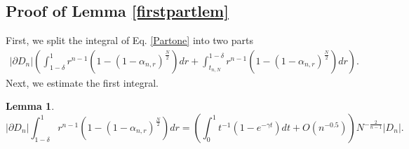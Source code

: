 \documentclass[10pt, twoside, leqno]{article}
\newtheorem{lemma}[thm]{Lemma}
\theoremstyle{definition}
\numberwithin{equation}{section}
\newcommand{\NN}{N^{-\frac 2{n-1} }}
\begin{document}
\subsection{Proof of Lemma \ref{firstpartlem}}
	First, we split the integral of Eq. \eqref{Partone} into two parts
	\begin{align*}
	|\partial D_{n}|\left(\int_{1-\delta}^{1}r^{n-1}\left(1-\left(1-\alpha_{n,r}\right)^{\frac{N}{2}}\right)dr + \int_{t_{n,N}}^{1-\delta}r^{n-1}\left(1-\left(1-\alpha_{n,r}\right)^{\frac{N}{2}}\right)dr \right).
	\end{align*}
Next, we estimate the first integral.
	\begin{lemma}
		$$
		|\partial D_{n}|\int_{1-\delta}^{1}r^{n-1}\left(1-\left(1-\alpha_{n,r}\right)^{\frac{N}{2}}\right)dr = \left(\int_{0}^{1}t^{-1}(1-e^{-\gamma t})dt+O(n^{-0.5})\right)\NN|D_n|.
		$$
	\end{lemma}
\end{document}
